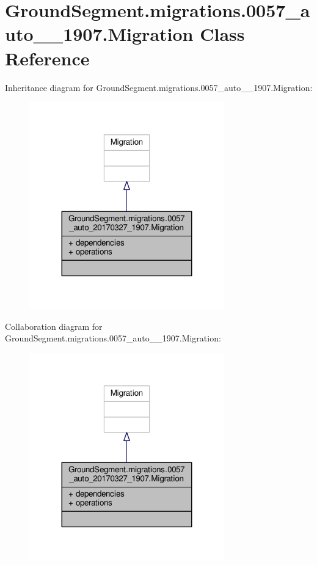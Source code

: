 \hypertarget{class_ground_segment_1_1migrations_1_10057__auto__20170327__1907_1_1_migration}{}\section{Ground\+Segment.\+migrations.0057\+\_\+auto\+\_\+\_\+1907.Migration Class Reference}
\label{class_ground_segment_1_1migrations_1_10057__auto__20170327__1907_1_1_migration}


Inheritance diagram for Ground\+Segment.\+migrations.0057\+\_\+auto\+\_\+\_\+1907.Migration\+:\nopagebreak
\begin{figure}[H]
\begin{center}
\leavevmode
\includegraphics[width=239pt]{class_ground_segment_1_1migrations_1_10057__auto__20170327__1907_1_1_migration__inherit__graph}
\end{center}
\end{figure}


Collaboration diagram for Ground\+Segment.\+migrations.0057\+\_\+auto\+\_\+\_\+1907.Migration\+:\nopagebreak
\begin{figure}[H]
\begin{center}
\leavevmode
\includegraphics[width=239pt]{class_ground_segment_1_1migrations_1_10057__auto__20170327__1907_1_1_migration__coll__graph}
\end{center}
\end{figure}
